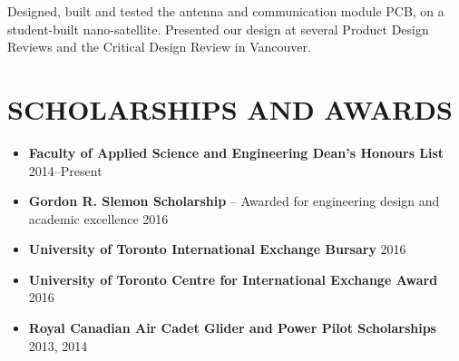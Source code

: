 \documentclass{ResumeTemplate}
\begin{document}
	\workitemstwo
	{Designed, built and tested the antenna and communication module PCB, on a student-built nano-satellite.}
	{Presented our design at several Product Design Reviews and the Critical Design Review in Vancouver.}
	
	\section{SCHOLARSHIPS AND AWARDS}	
	\begin{itemize}[noitemsep, leftmargin=*]
		\item \textbf{Faculty of Applied Science and Engineering Dean's Honours List} \hfill 2014--Present
		\item \textbf{Gordon R. Slemon Scholarship} -- Awarded for engineering design and academic excellence \hfill 2016
		\item \textbf{University of Toronto International Exchange Bursary} \hfill 2016
		\item \textbf{University of Toronto Centre for International Exchange Award} \hfill 2016
		\item \textbf{Royal Canadian Air Cadet Glider and Power Pilot Scholarships} \hfill 2013, 2014\vspace*{-\baselineskip}
	\end{itemize}
\end{document}
